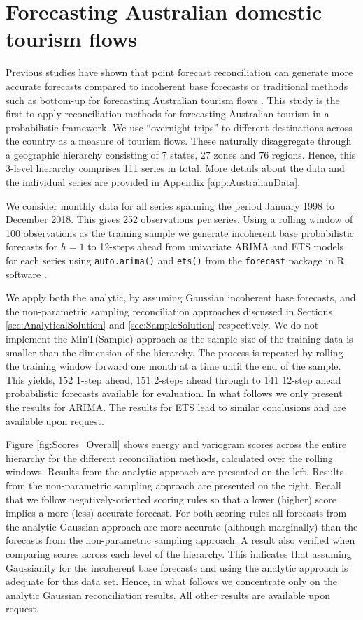 \documentclass[12pt]{article}
\theoremstyle{definition}
\begin{document}
\section{Forecasting Australian domestic tourism flows}\label{sec:Application}

Previous studies have shown that point forecast reconciliation can generate more accurate forecasts compared to incoherent base forecasts or traditional methods such as bottom-up for forecasting Australian tourism flows \citep[see for example,][]{AthEtAl2009, HynEtAl2011, WicEtAl2019}. This study is the first to apply reconciliation methods for forecasting Australian tourism in a probabilistic framework. We use ``overnight trips'' to different destinations across the country as a measure of tourism flows. These naturally disaggregate through a geographic hierarchy consisting of 7 states, 27 zones and 76 regions. Hence, this 3-level hierarchy comprises 111 series in total. More details about the data and the individual series are provided in Appendix \ref{app:AustralianData}.

We consider monthly data for all series spanning the period January 1998 to December 2018. This gives 252 observations per series. Using a rolling window of 100 observations as the training sample we generate incoherent base probabilistic forecasts for $h=1$ to 12-steps ahead from univariate ARIMA and ETS models for each series using \verb|auto.arima()| and \verb|ets()| from the \verb|forecast| package \citep{Rforecast} in R software \citep{Rcore}.

We apply both the analytic, by assuming Gaussian incoherent base forecasts, and the non-parametric sampling reconciliation approaches discussed in Sections \ref{sec:AnalyticalSolution} and \ref{sec:SampleSolution} respectively. We do not implement the MinT(Sample) approach as the sample size of the training data is smaller than the dimension of the hierarchy. The process is repeated by rolling the training window forward one month at a time until the end of the sample. This yields, $152$ 1-step ahead, $151$ 2-steps ahead through to $141$ 12-step ahead probabilistic forecasts available for evaluation. In what follows we only present the results for ARIMA. The results for ETS lead to similar conclusions and are available upon request.

Figure \ref{fig:Scores_Overall} shows energy and variogram scores across the entire hierarchy for the different reconciliation methods, calculated over the rolling windows. Results from the analytic approach are presented on the left. Results from the non-parametric sampling approach are presented on the right. Recall that we follow negatively-oriented scoring rules so that a lower (higher) score implies a more (less) accurate forecast. For both scoring rules all forecasts from the analytic Gaussian approach are more accurate (although marginally) than the forecasts from the non-parametric sampling approach. A result also verified when comparing scores across each level of the hierarchy. This indicates that assuming Gaussianity for the incoherent base forecasts and using the analytic approach is adequate for this data set. Hence, in what follows we concentrate only on the analytic Gaussian reconciliation results. All other results are available upon request.
\end{document}
